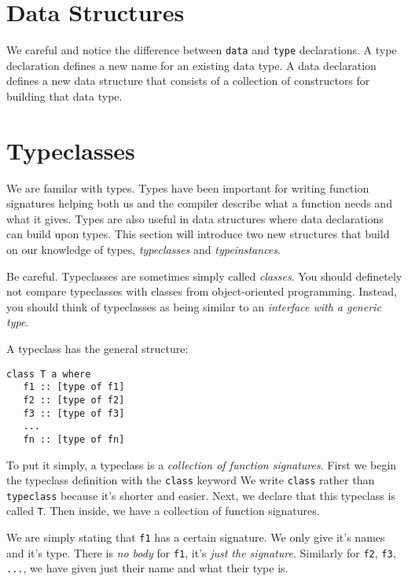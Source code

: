 

\chapter{Data Structures}


We careful and notice the difference between \lstinline{data} and \lstinline{type} declarations.
A type declaration defines a new name for an existing data type.
A data declaration defines a new data structure that consists of a collection of constructors for building that data type.



\chapter{Typeclasses}

We are familar with types. Types have been important for writing function 
signatures helping both us and the compiler describe what a function needs and what it gives.
Types are also useful in data structures where data declarations can build upon types. 	
This section will introduce two new structures that build on our knowledge of types, 
\textit{typeclasses} and \textit{typeinstances}. 


Be careful. Typeclasses are sometimes simply called \textit{classes}. 
You should definetely not compare typeclasses with 
classes from object-oriented programming. Instead, you should think of typeclasses 
as being similar to an \textit{interface with a generic type}.

A typeclass has the general structure:

\begin{lstlisting}
class T a where
   f1 :: [type of f1]
   f2 :: [type of f2]
   f3 :: [type of f3]
   ...
   fn :: [type of fn]
\end{lstlisting}

To put it simply, a typeclass is a \textit{collection of function signatures}.
First we begin the typeclass definition with the \lstinline{class} keyword
We write \lstinline{class} rather than \lstinline{typeclass} because it's shorter and easier.
Next, we declare that this typeclass is called \lstinline{T}. 
Then inside, we have a collection of function signatures. 

We are simply stating that \lstinline{f1}
has a certain signature. We only give it's names and it's type. 
There is \textit{no body} for \lstinline{f1}, it's \textit{just the signature}. 
Similarly for \lstinline{f2}, \lstinline{f3}, \lstinline{...}, we have given just their name 
and what their type is.

